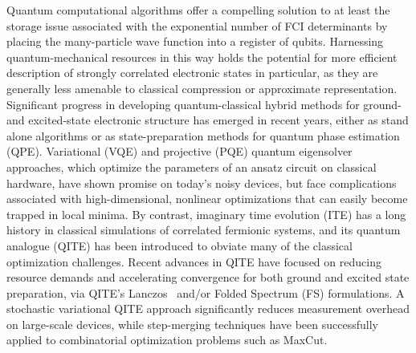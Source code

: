 \documentclass[aip,jcp,amsmath,amssymb, reprint]{revtex4-1}
\begin{document}
Quantum computational algorithms offer a compelling solution to at least the storage issue associated with the exponential number of FCI determinants by placing the many-particle wave function into a register of qubits.\cite{Abrams:1997ha,kassal2011simulating} 
Harnessing quantum-mechanical resources in this way holds the potential for more efficient description of strongly correlated electronic states in particular, as they are generally less amenable to classical compression or approximate representation. 
Significant progress in developing quantum-classical hybrid methods for ground- and excited-state electronic structure has emerged in recent years, either as stand alone algorithms or as state-preparation methods for quantum phase estimation (QPE).\cite{Abrams:1999ur}
Variational (VQE)\cite{Peruzzo:2014kca, yung2014transistor, McClean:2016bs, grimsley2019adaptive} and projective (PQE)\cite{stair2021simulating} quantum eigensolver approaches, which optimize the parameters of an ansatz circuit on classical hardware, have shown promise on today's noisy devices,\cite{OMalley:2016dc, colless2018computation, shen2017quantum, hempel2018quantum, nam2020ground} but face complications associated with high-dimensional, nonlinear optimizations that can easily become trapped in local minima. 
By contrast, imaginary time evolution (ITE) has a long history in classical simulations of correlated fermionic systems,\cite{feynman1948space,ceperley1980ground,sugiyama1986auxiliary,zhang1997constrained,foulkes2001quantum} and its quantum analogue (QITE) has been introduced\cite{motta2019determining} to obviate many of the classical optimization challenges. 
Recent advances in QITE have focused on reducing resource demands and accelerating convergence for both ground and excited state preparation, via QITE's Lanczos~\cite{motta2019determining} and/or Folded Spectrum (FS) formulations.\cite{Tsuchimochi2023Improved,McClean:2016bs,santagati2018witnessing,zhang2021adaptive}
A stochastic variational QITE approach significantly reduces measurement overhead on large-scale devices,\cite{gacon2023stochastic} while step-merging techniques have been successfully applied to combinatorial optimization problems such as MaxCut.\cite{gomes2020efficient,alam2023solving}
\end{document}
